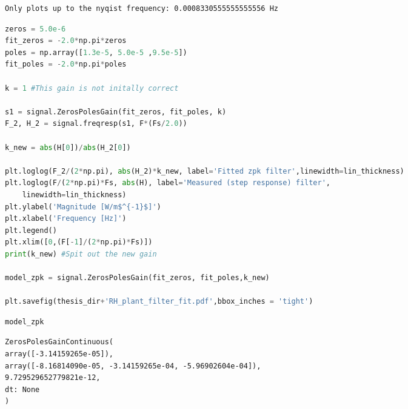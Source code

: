 \begin{spacing}{1.2} \begin{lstlisting}
Only plots up to the nyqist frequency: 0.0008330555555555556 Hz
\end{lstlisting} \end{spacing}

\begin{spacing}{1.2} \begin{lstlisting}[frame=single,language=Python]
zeros = 5.0e-6
fit_zeros = -2.0*np.pi*zeros
poles = np.array([1.3e-5, 5.0e-5 ,9.5e-5])
fit_poles = -2.0*np.pi*poles

k = 1 #This gain is not initally correct

s1 = signal.ZerosPolesGain(fit_zeros, fit_poles, k)
F_2, H_2 = signal.freqresp(s1, F*(Fs/2.0))

k_new = abs(H[0])/abs(H_2[0])

plt.loglog(F_2/(2*np.pi), abs(H_2)*k_new, label='Fitted zpk filter',linewidth=lin_thickness)
plt.loglog(F/(2*np.pi)*Fs, abs(H), label='Measured (step response) filter',
    linewidth=lin_thickness)
plt.ylabel('Magnitude [W/m$^{-1}$]')
plt.xlabel('Frequency [Hz]')
plt.legend()
plt.xlim([0,(F[-1]/(2*np.pi)*Fs)])
print(k_new) #Spit out the new gain

model_zpk = signal.ZerosPolesGain(fit_zeros, fit_poles,k_new)

plt.savefig(thesis_dir+'RH_plant_filter_fit.pdf',bbox_inches = 'tight')
\end{lstlisting} \end{spacing}


\begin{spacing}{1.2} \begin{lstlisting}[frame=single,language=Python]
model_zpk
\end{lstlisting} \end{spacing}

\begin{spacing}{1.2} \begin{lstlisting}[frame=single]
ZerosPolesGainContinuous(
array([-3.14159265e-05]),
array([-8.16814090e-05, -3.14159265e-04, -5.96902604e-04]),
9.729529652779821e-12,
dt: None
)
\end{lstlisting} \end{spacing}

